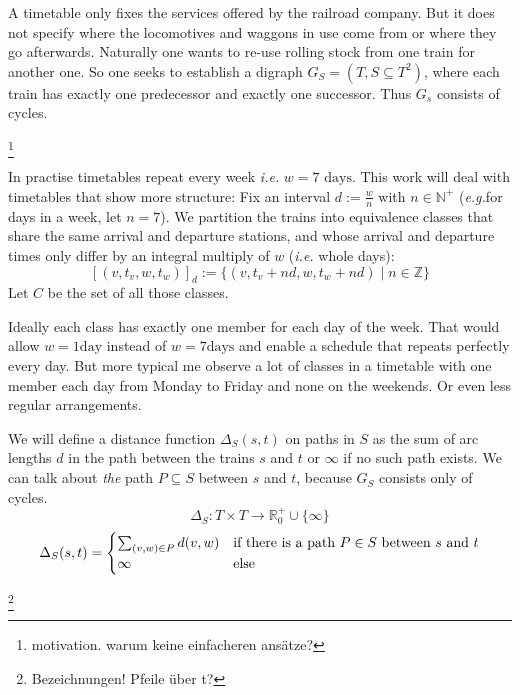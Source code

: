 \documentclass[a4paper]{amsart} %
\def\ie{\emph{i.e.}}
\def\eg{\emph{e.g.}}
\newcommand{\todo}[1]{\footnote{#1}}
\begin{document}
A timetable only fixes the services offered by the railroad company.
But it does not specify where the locomotives and waggons in use come
from or where they go afterwards.  Naturally one wants to re-use
rolling stock from one train for another one.  So one seeks to
establish a digraph \(G_S=(T,S\subseteq T^2)\), where each train has
exactly one predecessor and exactly one successor.  Thus \(G_s\)
consists of cycles.

\todo{motivation.  warum keine einfacheren ansätze?}

In practise timetables repeat every week \ie{} \(w = 7 \textrm{ days}\).
This work will deal with timetables that show more structure: Fix an
interval \(d := \frac{w}{n}\) with \(n \in \mathbb{N}^+\) (\eg for
days in a week, let \(n=7\)).  We partition the trains into
equivalence classes that share the same arrival and departure
stations, and whose arrival and departure times only differ by an
integral multiply of \(w\) (\ie{} whole days):
\begin{equation}
  \left[\left( v, t_v, w, t_w \right) \right]_d := \{(v, t_v+n d, w, t_w +n d) \mid n \in \mathbb{Z}\}
\end{equation}
Let \(C\) be the set of all those classes.

Ideally each class has exactly one member for each day of the week.
That would allow \(w = 1 \textrm{day}\) instead of \(w = 7 \textrm{days}\)
and enable a schedule that repeats perfectly every day.  But more
typical me observe a lot of classes in a timetable with one member
each day from Monday to Friday and none on the weekends.  Or even less
regular arrangements.

We will define a distance function \(\Delta_S (s,t)\) on paths in
\(S\) as the sum of arc lengths \(d\) in the path between the
trains \(s\) and \(t\) or \(\infty\) if no such path exists.  We can
talk about \emph{the} path \(P \subseteq S\) between \(s\) and \(t\),
because \(G_S\) consists only of cycles.
\[\Delta_{S}\colon T \times T \to \mathbb{R}^+_0 \cup \{\infty\}\]
\begin{equation}
\label{defDelta}
\Delta_S (s,t) = \begin{cases}
\sum_{(v,w)\in P} d(v,w) & \textrm{if there is a path \( P \in S\) between \(s\) and \(t\)}\\
\infty & \textrm{else}
\end{cases}
\end{equation}

\todo{Bezeichnungen!  Pfeile über t?}
\end{document}
